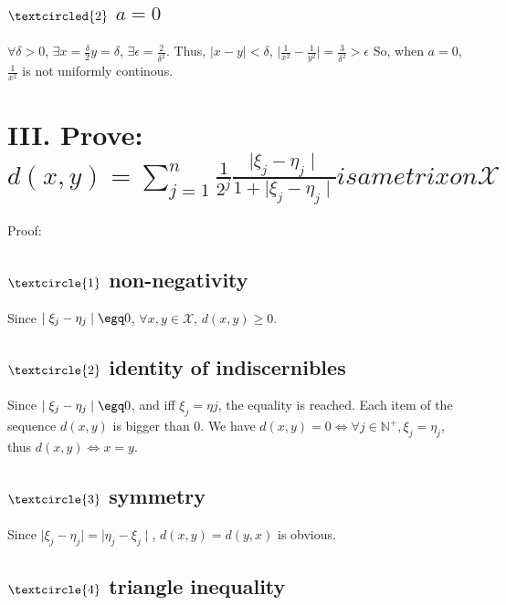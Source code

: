 \documentclass[twoside,a4paper]{article}
\begin{document}
\subsection*{\small{$\textcircled{2}$ $a=0$}}
$\forall \delta > 0$, $\exists x=\frac{\delta}{2} y=\delta$, $\exists \epsilon = \frac{2}{\delta^2}$.
Thus, $\mid x - y \mid < \delta$, $\mid \frac{1}{x^2} - \frac{1}{y^2} \mid = \frac{3}{\delta^2} > \epsilon$
So, when $a = 0$, $\frac{1}{x^2}$ is not uniformly continous.

\section*{III. \small{Prove: $d(x,y) = \sum_{j=1}^{n}\frac{1}{2^j}\frac{\mid\xi_{j} - \eta_{j}\mid}{1 + \mid\xi_{j} - \eta_{j}\mid} is a metrix on \mathcal{X}$}}
Proof:

\subsection*{\small{$\textcircle{1}$ non-negativity}}
Since $\mid\xi_{j} - \eta_{j}\mid \egq 0$, $\forall x,y \in \mathcal{X}$, $d(x,y) \geq 0$.

\subsection*{\small{$\textcircle{2}$ identity of indiscernibles}} 
Since $\mid\xi_{j} - \eta_{j}\mid \egq 0$, and iff $\xi_{j} = \eta{j}$, the equality is reached. Each item of the sequence $d(x,y)$ is bigger than 0.
We have $d(x,y) = 0 \iff \forall j \in \mathbb{N}^+, \xi_{j} = \eta_{j}$, thus $d(x,y) \iff x = y$. 

\subsection*{\small{$\textcircle{3}$ symmetry}}
Since $\mid\xi_{j} - \eta_{j}\mid = \mid\eta_{j} - \xi_{j}\mid$, $d(x,y) = d(y,x)$ is obvious.

\subsection*{\small{$\textcircle{4}$ triangle inequality}}
\end{document}

